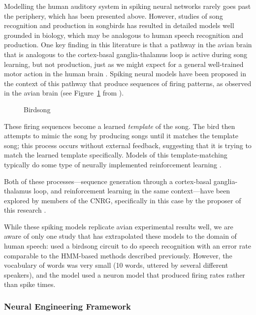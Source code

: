 \documentclass{article}
\begin{document}
Modelling the human auditory system
in spiking neural networks
rarely goes past the periphery,
which has been presented above.
However, studies of
song recognition and production
in songbirds has resulted in
detailed models well grounded in biology,
which may be analogous
to human speech recognition and production.
One key finding in this literature
is that a pathway in the avian brain
that is analogous to
the cortex-basal ganglia-thalamus loop
is active during song learning,
but not production,
just as we might expect
for a general well-trained motor action
in the human brain
\citep{fiete2008}.
Spiking neural models have been proposed
in the context of this pathway
that produce sequences of firing patterns,
as observed in the avian brain
(see Figure~\ref{fig:birdsong} from \citep{XXX}).

\begin{figure}
  \begin{center}
  \end{center}
  \caption{Birdsong}
  \label{fig:birdsong}
\end{figure}

These firing sequences become
a learned \textit{template} of the song.
The bird then attempts to mimic the song
by producing songs until it matches
the template song;
this process occurs without
external feedback,
suggesting that it is trying
to match the learned template specifically.
Models of this template-matching
typically do some type of neurally
implemented reinforcement learning \citep{XXX}.

Both of these processes---sequence generation
through a cortex-basal ganglia-thalamus loop,
and reinforcement learning in the same context---have
been explored by members of the CNRG,
specifically in this case by
the proposer of this research
\citep{XXX}.

While these spiking models
replicate avian experimental results well,
we are aware of only one study that
has extrapolated these models
to the domain of human speech:
\citet{yildizXXX} used a birdsong
circuit to do speech recognition
with an error rate comparable
to the HMM-based methods described previously.
However, the vocabulary of words was very small
(10 words, uttered by several different speakers),
and the model used a neuron model
that produced firing rates rather than spike times.

\subsubsection{Neural Engineering Framework}
\label{subsec:nef}
\end{document}
